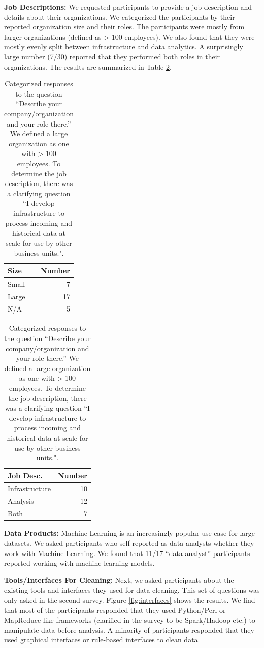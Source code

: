 \vspace{0.5em}

\noindent\textbf{Job Descriptions: } We requested participants to provide a job description and details about their organizations. We categorized the participants by their reported organization size and their roles. The participants were mostly from larger organizations (defined as > 100 employees). We also found that they were mostly evenly split between infrastructure and data analytics. A surprisingly large number (7/30) reported that they performed both roles in their organizations. The results are summarized in Table \ref{tab:jobs}. 

\begin{table}[t]
\centering
\begin{tabular}{l|r}
Size                               & Number \\
\hline
Small    & 7      \\
Large & 17     \\
N/A                                & 5\\  %
\end{tabular}
\quad
\begin{tabular}{l|r}
Job Desc.                              & Number \\
\hline
Infrastructure    & 10      \\
Analysis & 12     \\
Both                                & 7\\  %
\end{tabular}

\caption{Categorized responses to the question ``Describe your company/organization and your role there.'' We defined a large organization as one with > 100 employees. To determine the job description, there was a clarifying question ``I develop infrastructure to process incoming and historical data at scale for use by other business units.". \label{tab:jobs}}
\end{table}

\vspace{0.5em}
\noindent\textbf{Data Products: } Machine Learning is an increasingly popular use-case for large datasets. We asked participants who self-reported as data analysts whether they work with Machine Learning. We found that 11/17 ``data analyst'' participants reported working with machine learning models.

\vspace{0.5em}
\noindent\textbf{Tools/Interfaces For Cleaning: } Next, we asked participants about the existing tools and interfaces they used for data cleaning. This set of questions was only asked in the second survey. Figure \ref{fig:interfaces} shows the results. We find that most of the participants responded that they used Python/Perl or MapReduce-like frameworks (clarified in the survey to be Spark/Hadoop etc.) to manipulate data before analysis. A minority of participants responded that they used graphical interfaces or rule-based interfaces to clean data.

